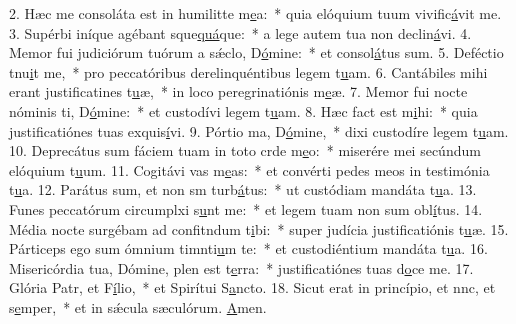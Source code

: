 2. Hæc me consoláta est in humilitte m\uline{e}a:~* quia elóquium tuum vivific\uline{á}vit me.
3. Supérbi iníque agébant sque\uline{quá}que:~* a lege autem tua non declin\uline{á}vi.
4. Memor fui judiciórum tuórum a sǽclo, D\uline{ó}mine:~* et consol\uline{á}tus sum.
5. Deféctio tnu\uline{i}t me,~* pro peccatóribus derelinquéntibus legem t\uline{u}am.
6. Cantábiles mihi erant justificatines t\uline{u}æ,~* in loco peregrinatiónis m\uline{e}æ.
7. Memor fui nocte nóminis ti, D\uline{ó}mine:~* et custodívi legem t\uline{u}am.
8. Hæc fact est m\uline{i}hi:~* quia justificatiónes tuas exquis\uline{í}vi.
9. Pórtio ma, D\uline{ó}mine,~* dixi custodíre legem t\uline{u}am.
10. Deprecátus sum fáciem tuam in toto crde m\uline{e}o:~* miserére mei secúndum elóquium t\uline{u}um.
11. Cogitávi vas m\uline{e}as:~* et convérti pedes meos in testimónia t\uline{u}a.
12. Parátus sum, et non sm turb\uline{á}tus:~* ut custódiam mandáta t\uline{u}a.
13. Funes peccatórum circumplxi s\uline{u}nt me:~* et legem tuam non sum obl\uline{í}tus.
14. Média nocte surgébam ad confitndum t\uline{i}bi:~* super judícia justificatiónis t\uline{u}æ.
15. Párticeps ego sum ómnium timnti\uline{u}m te:~* et custodiéntium mandáta t\uline{u}a.
16. Misericórdia tua, Dómine, plen est t\uline{e}rra:~* justificatiónes tuas d\uline{o}ce me.
17. Glória Patr, et F\uline{í}lio,~* et Spirítui S\uline{a}ncto.
18. Sicut erat in princípio, et nnc, et s\uline{e}mper,~* et in sǽcula sæculórum. \uline{A}men.

